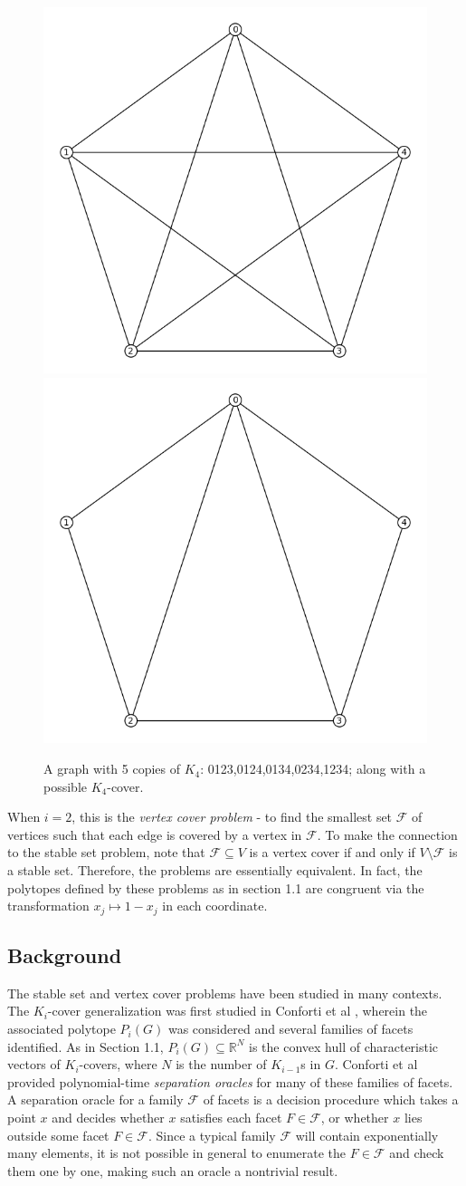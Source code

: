 \begin{figure}[htd]
	\centering
	\includegraphics[width=.4\textwidth,natwidth=613,natheight=584]{K5.png}
	\includegraphics[width=.4\textwidth,natwidth=613,natheight=584]{K4cover.png}
	\caption{A graph with 5 copies of $K_4$: 0123,0124,0134,0234,1234; along with a possible $K_4$-cover.}
	\label{K5}
\end{figure}

When $i=2$, this is the \emph{vertex cover problem} - to find the smallest set $\mathcal{F}$ of vertices such that each edge is covered by a vertex in $\mathcal{F}$. 
To make the connection to the stable set problem, note that $\mathcal{F} \subseteq V$ is a vertex cover if and only if $V \setminus \mathcal{F}$ is a stable set.
Therefore, the problems are essentially equivalent.
In fact, the polytopes defined by these problems as in section 1.1 are congruent via the transformation $x_j \mapsto 1-x_j$ in each coordinate.

\subsection{Background}

The stable set and vertex cover problems have been studied in many contexts. 
The $K_i$-cover generalization was first studied in Conforti et al \cite{conforti}, wherein the associated polytope $P_i(G)$ was considered and several families of facets identified. 
As in Section 1.1, $P_i(G) \subseteq \mathbb{R}^N$ is the convex hull of characteristic vectors of $K_i$-covers, where $N$ is the number of $K_{i-1}$s in $G$. 
Conforti et al provided polynomial-time {\em separation oracles} for many of these families of facets. 
A separation oracle for a family $\mathcal{F}$ of facets is a decision procedure which takes a point $x$ and decides whether $x$ satisfies each facet $F \in \mathcal{F}$, or whether $x$ lies outside some facet $F \in \mathcal{F}$.
Since a typical family $\mathcal{F}$ will contain exponentially many elements, it is not possible in general to enumerate the $F \in \mathcal{F}$ and check them one by one, making such an oracle a nontrivial result.

